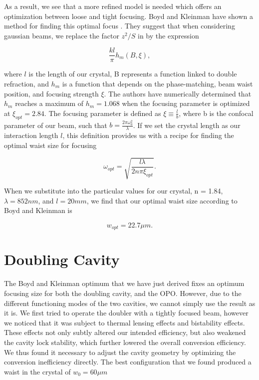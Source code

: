 As a result, we see that a more refined model is needed which offers an optimization between loose and tight focusing.  Boyd and Kleinman have shown a method for finding this optimal focus \cite{Boyd68}.  They suggest that when considering gaussian beams, we replace the factor $z^2/S$ in  by the expression

\begin{equation}
  \label{eq:bk_replace}
  \frac{k l}{\pi} h_m(B, \xi), 
\end{equation}

\noindent 
where $l$ is the length of our crystal, B represents a function linked to double refraction, and $h_m$ is a function that depends on the phase-matching, beam waist position, and focusing strength $\xi$.  The authors have numerically determined that $h_m$ reaches a maximum of $h_m = 1.068$ when the focusing parameter is optimized at $\xi_{opt} = 2.84$.  The focusing parameter is defined as $\xi \equiv \frac{l}{b} $, where b is the confocal parameter of our beam, such that $b = \frac{2 \pi \omega_0 ^2 }{ \lambda}$.  If we set the crystal length as our interaction length $l$, this definition provides us with a recipe for finding the optimal waist size for focusing

\begin{equation}
  \label{eq:bk_opt_waist}
  \omega_{opt} = \sqrt{\frac{l \lambda}{2 n \pi \xi_{opt}}} .
\end{equation}

\noindent
When we substitute into  the particular values for our crystal, n = 1.84, $\lambda = 852 nm$, and $l=20 mm$, we find that our optimal waist size according to Boyd and Kleinman is 

\begin{equation}
  \label{eq:w_opt_ppktp}
  w_{opt} = 22.7 \mu m.
\end{equation}

\section{Doubling Cavity}
\label{doubling_cavity} 

The Boyd and Kleinman optimum that we have just derived fixes an optimum focusing size for both the doubling cavity, and the OPO.  However, due to the different functioning modes of the two cavities, we cannot simply use the result as it is.  We first tried to operate the doubler with a tightly focused beam, however we noticed that it was subject to thermal lensing effects and bistability effects.  These effects not only subtly altered our intended efficiency, but also weakened the cavity lock stability, which further lowered the overall conversion efficiency.  We thus found it necessary to adjust the cavity geometry by optimizing the conversion inefficiency directly.  The best configuration that we found produced a waist in the crystal of $w_0 = 60 \mu m$


